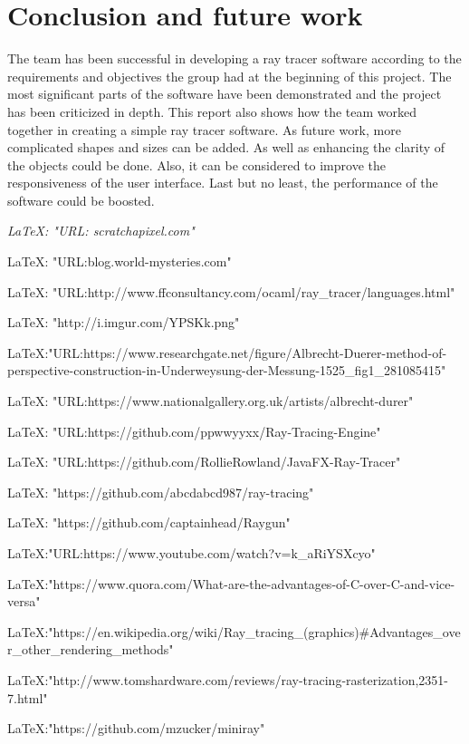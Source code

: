 \documentclass{article}
\begin{document}
\section{Conclusion and future work}

The team has been successful in developing a ray tracer software according to the requirements and objectives the group had at the beginning of this project. The most significant parts of the software have been demonstrated and the project has been criticized in depth. 
This report also shows how the team worked together in creating a simple ray tracer software. 
As future work, more complicated shapes and sizes can be added. As well as enhancing the clarity of the objects could be done. Also, it can be considered to improve the responsiveness of the user interface. Last but no least, the performance of the software could be boosted. 

\newpage


\begin{thebibliography}{9}

  \textit{\LaTeX: "URL: scratchapixel.com"}
  
{\LaTeX: "URL:blog.world-mysteries.com"}
  

{\LaTeX: "URL:http://www.ffconsultancy.com/ocaml/ray_tracer/languages.html"}

{\LaTeX: "http://i.imgur.com/YPSKk.png"}

{\LaTeX:"URL:https://www.researchgate.net/figure/Albrecht-Duerer-method-of-perspective-construction-in-Underweysung-der-Messung-1525_fig1_281085415"}

{\LaTeX: "URL:https://www.nationalgallery.org.uk/artists/albrecht-durer"}


 {\LaTeX: "URL:https://github.com/ppwwyyxx/Ray-Tracing-Engine"}

 {\LaTeX: "URL:https://github.com/RollieRowland/JavaFX-Ray-Tracer"}

 {\LaTeX: "https://github.com/abcdabcd987/ray-tracing"}

 {\LaTeX: "https://github.com/captainhead/Raygun"}

{\LaTeX:"URL:https://www.youtube.com/watch?v=k_aRiYSXcyo"}

{\LaTeX:"https://www.quora.com/What-are-the-advantages-of-C-over-C-and-vice-versa"}


{\LaTeX:"https://en.wikipedia.org/wiki/Ray_tracing_(graphics)#Advantages_over_other_rendering_methods"}

{\LaTeX:"http://www.tomshardware.com/reviews/ray-tracing-rasterization,2351-7.html"}


{\LaTeX:"https://github.com/mzucker/miniray"}

\end{thebibliography}
\end{document}
